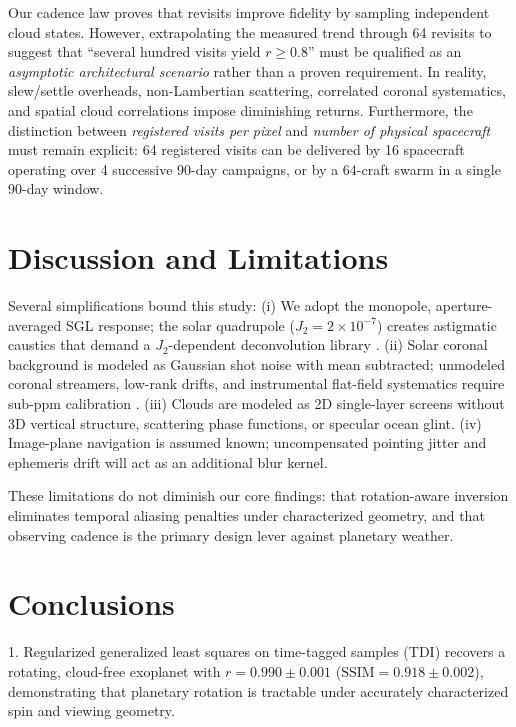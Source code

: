 \documentclass[twocolumn]{emulateapj}
\begin{document}
 Our cadence law proves that
revisits improve fidelity by sampling independent cloud states. However,
extrapolating the measured trend through 64 revisits to suggest that
``several hundred visits yield $r\ge0.8$'' must be qualified as an
{\it asymptotic architectural scenario} rather than a proven requirement.
In reality, slew/settle overheads, non-Lambertian scattering, correlated
coronal systematics, and spatial cloud correlations impose diminishing returns.
Furthermore, the distinction between {\it registered visits per pixel} and
{\it number of physical spacecraft} must remain explicit: 64 registered visits
can be delivered by 16 spacecraft operating over 4 successive 90-day campaigns,
or by a 64-craft swarm in a single 90-day window.

\section{Discussion and Limitations}
\label{sec:discussion}

Several simplifications bound this study:
(i) We adopt the monopole, aperture-averaged SGL response; the solar
quadrupole ($J_2=2\times10^{-7}$) creates astigmatic caustics that demand
a $J_2$-dependent deconvolution library \citep{tt21quad}.
(ii) Solar coronal background is modeled as Gaussian shot noise with mean
subtracted; unmodeled coronal streamers, low-rank drifts, and instrumental
flat-field systematics require sub-ppm calibration \citep{tur26bench}.
(iii) Clouds are modeled as 2D single-layer screens without 3D vertical
structure, scattering phase functions, or specular ocean glint.
(iv) Image-plane navigation is assumed known; uncompensated pointing jitter
and ephemeris drift will act as an additional blur kernel.

These limitations do not diminish our core findings: that rotation-aware
inversion eliminates temporal aliasing penalties under characterized geometry,
and that observing cadence is the primary design lever against planetary weather.

\section{Conclusions}
\label{sec:conclusions}

1. Regularized generalized least squares on time-tagged samples (TDI) recovers
a rotating, cloud-free exoplanet with $r=0.990\pm0.001$ ($\mathrm{SSIM}=0.918\pm0.002$),
demonstrating that planetary rotation is tractable under accurately characterized
spin and viewing geometry.
\end{document}
